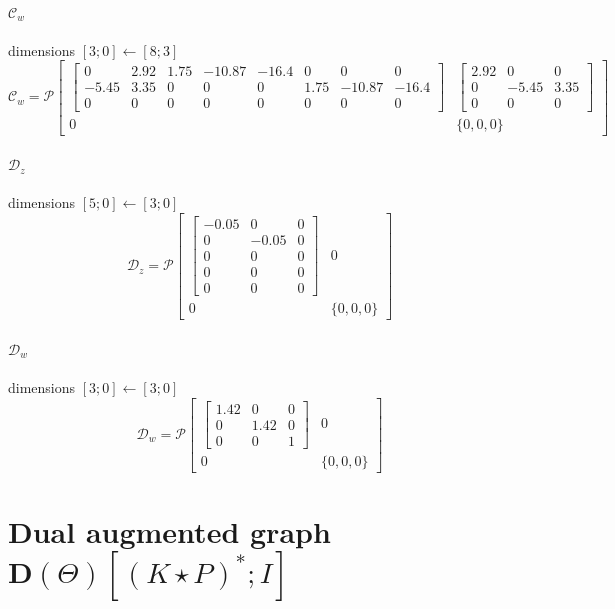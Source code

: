 \documentclass{article}
\newcommand{\PIop}[6]{\mathcal P\!\left[\begin{array}{c|c}#1&#2\\\hline#3&\{#4,#5,#6\}\end{array}\right]}
\begin{document}
\paragraph{$\mathcal C_w$}\hfill dimensions $[3;0]\leftarrow[8;3]$
\[\displaystyle \mathcal C_w=\PIop{\begin{bmatrix}0 & 2.92 & 1.75 & -10.87 & -16.4 & 0 & 0 & 0\\-5.45 & 3.35 & 0 & 0 & 0 & 1.75 & -10.87 & -16.4\\0 & 0 & 0 & 0 & 0 & 0 & 0 & 0\end{bmatrix}}{\begin{bmatrix}2.92 & 0 & 0\\0 & -5.45 & 3.35\\0 & 0 & 0\end{bmatrix}}{0}{0}{0}{0}\]
\paragraph{$\mathcal D_z$}\hfill dimensions $[5;0]\leftarrow[3;0]$
\[\displaystyle \mathcal D_z=\PIop{\begin{bmatrix}-0.05 & 0 & 0\\0 & -0.05 & 0\\0 & 0 & 0\\0 & 0 & 0\\0 & 0 & 0\end{bmatrix}}{0}{0}{0}{0}{0}\]
\paragraph{$\mathcal D_w$}\hfill dimensions $[3;0]\leftarrow[3;0]$
\[\displaystyle \mathcal D_w=\PIop{\begin{bmatrix}1.42 & 0 & 0\\0 & 1.42 & 0\\0 & 0 & 1\end{bmatrix}}{0}{0}{0}{0}{0}\]
\section*{Dual augmented graph $\mathbf D(\Theta)[(K\star P)^*;I]$}
\end{document}
